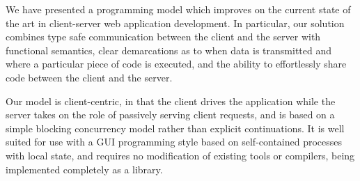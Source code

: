 \documentclass[preprint]{sigplanconf}
\begin{document}
We have presented a programming model which improves on the current state of
the art in client-server web application development. In particular, our
solution combines type safe communication between the client and the server
with functional semantics, clear demarcations as to when data is transmitted
and where a particular piece of code is executed, and the ability to
effortlessly share code between the client and the server.

Our model is client-centric, in that the client drives the application while
the server takes on the role of passively serving client requests, and is based
on a simple blocking concurrency model rather than explicit continuations.
It is well suited for use with a GUI programming style based on
self-contained processes with local state, and requires no modification of
existing tools or compilers, being implemented completely as a library.




\end{document}
